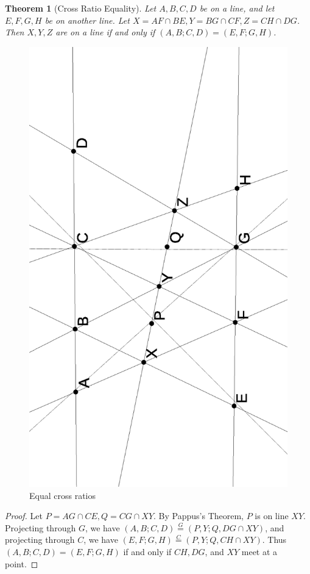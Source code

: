 \documentclass[letterpaper,11pt]{article}
\newtheorem{thm}{Theorem}
\theoremstyle{definition}
\theoremstyle{remark}
\begin{document}
\begin{thm}[Cross Ratio Equality]\label{cr-equal} Let $A,B,C,D$ be on a line, and let $E,F,G,H$ be on another line. Let $X = AF\cap BE, Y = BG\cap CF, Z = CH\cap DG$. Then $X,Y,Z$ are on a line if and only if $(A,B;C,D) = (E,F;G,H)$.
\end{thm}
\begin{figure}[!htb]
\centering
\includegraphics[scale=.5,angle=270]{equal.eps}
\caption{Equal cross ratios}
\end{figure}
\begin{proof} Let $P = AG\cap CE, Q = CG\cap XY$. By Pappus's Theorem, $P$ is on line $XY$. Projecting through $G$, we have $(A,B;C,D) \stackrel{G}{=} (P,Y;Q,DG\cap XY)$, and projecting through $C$, we have $(E,F;G,H) \stackrel{C}{=} (P,Y;Q,CH\cap XY)$. Thus $(A,B;C,D) = (E,F;G,H)$ if and only if $CH, DG$, and $XY$ meet at a point.
\end{proof}
\end{document}
